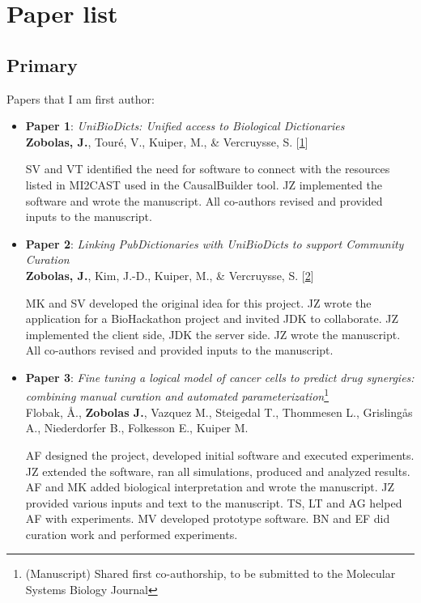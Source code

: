 \documentclass[
  12pt,
]{book}
\begin{document}
\hypertarget{paper-list}{%
\chapter*{Paper list}\label{paper-list}}

\hypertarget{primary}{%
\section*{Primary}\label{primary}}

Papers that I am first author:

\hypertarget{Paper1}{}
\begin{itemize}
\item
  \textbf{Paper 1}: \emph{UniBioDicts: Unified access to Biological Dictionaries}\\
  \textbf{Zobolas, J.}, Touré, V., Kuiper, M., \& Vercruysse, S. {[}\protect\hyperlink{ref-UBDs}{1}{]}

  SV and VT identified the need for software to connect with the resources listed in MI2CAST used in the CausalBuilder tool. JZ implemented the software and wrote the manuscript. All co-authors revised and provided inputs to the manuscript.
\end{itemize}

\hypertarget{Paper2}{}
\begin{itemize}
\item
  \textbf{Paper 2}: \emph{Linking PubDictionaries with UniBioDicts to support Community Curation}\\
  \textbf{Zobolas, J.}, Kim, J.-D., Kuiper, M., \& Vercruysse, S. {[}\protect\hyperlink{ref-Zobolas2020-pubdict}{2}{]}

  MK and SV developed the original idea for this project. JZ wrote the application for a BioHackathon project and invited JDK to collaborate. JZ implemented the client side, JDK the server side. JZ wrote the manuscript. All co-authors revised and provided inputs to the manuscript.
\end{itemize}

\hypertarget{Paper3}{}
\begin{itemize}
\item
  \textbf{Paper 3}: \emph{Fine tuning a logical model of cancer cells to predict drug synergies: combining manual curation and automated parameterization}\footnote{(Manuscript) Shared first co-authorship, to be submitted to the Molecular Systems Biology Journal}\\
  Flobak, Å., \textbf{Zobolas J.}, Vazquez M., Steigedal T., Thommesen L., Grislingås A., Niederdorfer B., Folkesson E., Kuiper M.

  AF designed the project, developed initial software and executed experiments. JZ extended the software, ran all simulations, produced and analyzed results. AF and MK added biological interpretation and wrote the manuscript. JZ provided various inputs and text to the manuscript. TS, LT and AG helped AF with experiments. MV developed prototype software. BN and EF did curation work and performed experiments.
\end{itemize}
\end{document}
